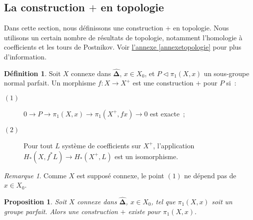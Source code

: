 \documentclass{amsart}
\newcommand{\sref}[2]{\hyperref[#2]{#1 \ref*{#2}}}
\theoremstyle{plain}
\newtheorem{prop}[theo]{Proposition}
\theoremstyle{definition}
\newtheorem{defi}[theo]{Définition}
\theoremstyle{remark}
\newtheorem{rem}[theo]{Remarque}
\newcommand{\DEns}{\widehat{\mathbf{\Delta}}}
\newcommand{\ra}{\rightarrow}
\begin{document}
\subsection{\texorpdfstring{La construction $+$ en topologie}{La construction + en topologie}}

Dans cette section, nous définissons une construction $+$ en topologie. Nous utilisons un certain nombre de résultats
de topologie, notamment l'homologie à coefficients et les tours de Postnikov.
Voir \sref{l'annexe}{annexetopologie} pour plus d'information.

\begin{defi}\label{definitionplustopologie}
  Soit $X$ connexe dans $\DEns$, $x\in X_0$, et $P\triangleleft \pi_1(X,x)$ un sous-groupe normal parfait.
  Un morphisme $f:X\ra X^+$ est une construction $+$ pour $P$ si~:
  \begin{description}
    \item[$(1)$] $0\ra P\ra \pi_1(X,x) \ra \pi_1(X^+,fx)\ra 0$ est exacte~;
    \item[$(2)$] Pour tout $L$ système de coefficients sur $X^+$, l'application $H_*(X,f^*L)\ra H_*(X^+,L)$ est un isomorphisme.
  \end{description}
\end{defi}

\begin{rem}
  Comme $X$ est supposé connexe, le point $(1)$ ne dépend pas de $x\in X_0$.
\end{rem}

\begin{prop}\label{constructionpluscasfacile}
  Soit $X$ connexe dans $\DEns$, $x\in X_0$, tel que $\pi_1(X,x)$ soit un groupe parfait. Alors une construction $+$ existe pour $\pi_1(X,x)$.
\end{prop}
\end{document}

